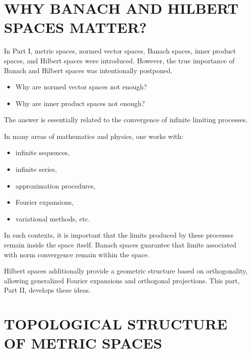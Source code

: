 \documentclass[aps,prl,twocolumn,groupedaddress]{revtex4-2}
\begin{document}
\maketitle
\onecolumngrid


\section{WHY BANACH AND HILBERT SPACES MATTER?}

In Part I, metric spaces, normed vector spaces, Banach spaces, inner product spaces, and Hilbert spaces were introduced. However, the true importance of Banach and Hilbert spaces was intentionally postponed.
\begin{itemize}
\item Why are normed vector spaces not enough?
\item Why are inner product spaces not enough?
\end{itemize}
The answer is essentially related to the convergence of infinite limiting processes.

In many areas of mathematics and physics, one works with:
\begin{itemize}
\item infinite sequences,
\item infinite series,
\item approximation procedures,
\item Fourier expansions,
\item variational methods, etc.
\end{itemize}
In such contexts, it is important that the limits produced by these processes remain inside the space itself.
Banach spaces guarantee that limits associated with norm convergence remain within the space. 

Hilbert spaces additionally provide a geometric structure based on orthogonality, allowing generalized Fourier expansions and orthogonal projections.
This part, Part II, develops these ideas.

\section{TOPOLOGICAL STRUCTURE OF METRIC SPACES}
\end{document}
